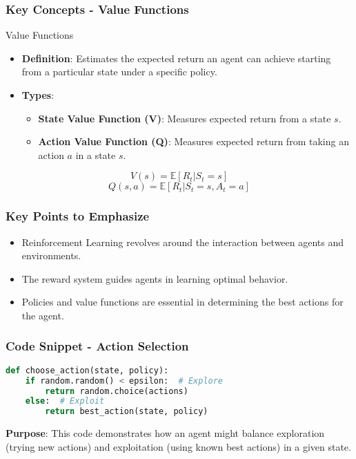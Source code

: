 \documentclass{beamer}
\begin{document}
\begin{frame}[fragile]
    \frametitle{Key Concepts - Value Functions}
    \begin{block}{Value Functions}
        \begin{itemize}
            \item \textbf{Definition}: Estimates the expected return an agent can achieve starting from a particular state under a specific policy.
            \item \textbf{Types}:
                \begin{itemize}
                    \item \textbf{State Value Function (V)}: Measures expected return from a state \( s \).
                    \item \textbf{Action Value Function (Q)}: Measures expected return from taking an action \( a \) in a state \( s \).
                \end{itemize}
        \end{itemize}
        \begin{equation}
            V(s) = \mathbb{E}[R_t | S_t = s]
        \end{equation}
        \begin{equation}
            Q(s, a) = \mathbb{E}[R_t | S_t = s, A_t = a]
        \end{equation}
    \end{block}
\end{frame}

\begin{frame}[fragile]
    \frametitle{Key Points to Emphasize}
    \begin{itemize}
        \item Reinforcement Learning revolves around the interaction between agents and environments.
        \item The reward system guides agents in learning optimal behavior.
        \item Policies and value functions are essential in determining the best actions for the agent.
    \end{itemize}
\end{frame}

\begin{frame}[fragile]
    \frametitle{Code Snippet - Action Selection}
    \begin{lstlisting}[language=Python]
def choose_action(state, policy):
    if random.random() < epsilon:  # Explore
        return random.choice(actions)
    else:  # Exploit
        return best_action(state, policy)
    \end{lstlisting}
    \textbf{Purpose}: This code demonstrates how an agent might balance exploration (trying new actions) and exploitation (using known best actions) in a given state.
\end{frame}
\end{document}
